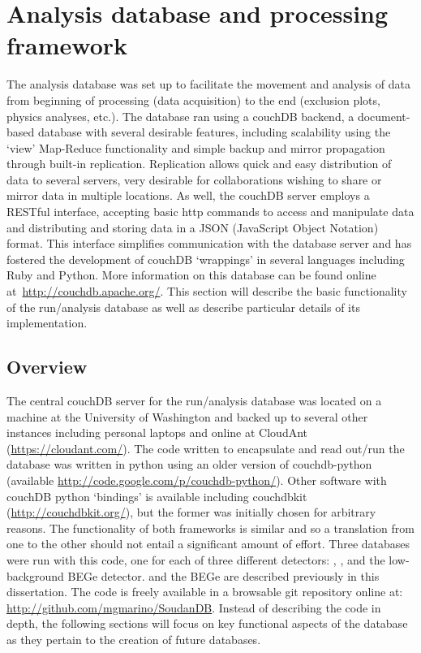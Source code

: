 	\section{Analysis database and processing framework}
	\label{sec:AnalysisDBProcFramework}
	\lstset{
	   language=JSON,
	   extendedchars=true,
	   basicstyle=\footnotesize\ttfamily,
	   showstringspaces=false,
	   showspaces=false,
	   numbers=left,
	   numberstyle=\footnotesize,
	   numbersep=9pt,
	   tabsize=2,
	   breaklines=true,
	   showtabs=false,
	   captionpos=b
	}	
	The analysis database was set up to facilitate the movement and analysis of data from beginning of processing (data acquisition) to the end (exclusion plots, physics analyses, etc.).  The database ran using a couchDB backend, a document-based database with several desirable features, including scalability using the `view' Map-Reduce functionality and simple backup and mirror propagation through built-in replication.  Replication allows quick and easy distribution of data to several servers, very desirable for collaborations wishing to share or mirror data in multiple locations.  As well, the couchDB server employs a RESTful interface, accepting basic http commands to access and manipulate data and distributing and storing data in a JSON (JavaScript Object Notation) format.  This interface simplifies communication with the database server and has fostered the development of couchDB `wrappings' in several languages including Ruby and Python.  More information on this database can be found online at~\url{http://couchdb.apache.org/}.  This section will describe the basic functionality of the run/analysis database as well as describe particular details of its implementation.  
	
		\subsection{Overview}
		
	The central couchDB server for the run/analysis database was located on a machine at the University of Washington and backed up to several other instances including personal laptops and online at CloudAnt (\url{https://cloudant.com/}).  The code written to encapsulate and read out/run the database was written in python using an older version of couchdb-python (available \url{http://code.google.com/p/couchdb-python/}).  Other software with couchDB python `bindings' is available including couchdbkit (\url{http://couchdbkit.org/}), but the former was initially chosen for arbitrary reasons.  The functionality of both frameworks is similar and so a translation from one to the other should not entail a significant amount of effort.  Three databases were run with this code, one for each of three different detectors: , , and the low-background BEGe detector.   and the BEGe are described previously in this dissertation.  The code is freely available in a browsable git repository online at: \url{http://github.com/mgmarino/SoudanDB}.  Instead of describing the code in depth, the following sections will focus on key functional aspects of the database as they pertain to the creation of future databases.  
	
